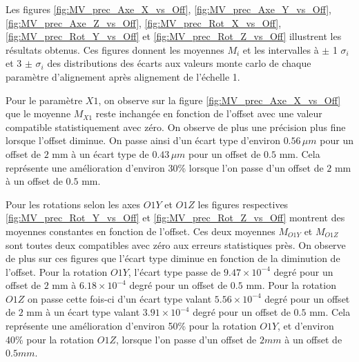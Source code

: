    \medskip

   Les figures \ref{fig:MV_prec_Axe_X_vs_Off}, \ref{fig:MV_prec_Axe_Y_vs_Off}, \ref{fig:MV_prec_Axe_Z_vs_Off}, \ref{fig:MV_prec_Rot_X_vs_Off}, \ref{fig:MV_prec_Rot_Y_vs_Off} et \ref{fig:MV_prec_Rot_Z_vs_Off} illustrent les r\'esultats obtenus. Ces figures donnent les moyennes $M_i$ et les intervalles \`a $\pm$ 1 $\sigma_i$ et 3 $\pm$ $\sigma_i$ des distributions des \'ecarts aux valeurs monte carlo de chaque param\`etre d'alignement apr\`es alignement de l'\'echelle 1.
   
   \medskip

   Pour le param\`etre $X1$, on observe sur la figure \ref{fig:MV_prec_Axe_X_vs_Off} que le moyenne $M_{X1}$ reste inchang\'ee en fonction de l'offset avec une valeur compatible statistiquement avec z\'ero. On observe de plus une pr\'ecision plus fine lorsque l'offset diminue. On passe ainsi d'un \'ecart type d'environ $0.56 \, \mu m$ pour un offset de $2$ mm \`a un \'ecart type de $0.43 \, \mu m$ pour un offset de $0.5$ mm. Cela repr\'esente une am\'elioration d'environ 30\% lorsque l'on passe d'un offset de $2$ mm \`a un offset de $0.5$ mm.
   
   \medskip

   Pour les rotations selon les axes $O1Y$ et $O1Z$ les figures respectives \ref{fig:MV_prec_Rot_Y_vs_Off} et \ref{fig:MV_prec_Rot_Z_vs_Off} montrent des moyennes constantes en fonction de l'offset. Ces deux moyennes $M_{O1Y}$ et $M_{O1Z}$ sont toutes deux compatibles avec z\'ero aux erreurs statistiques pr\`es. On observe de plus sur ces figures que l'\'ecart type diminue en fonction de la diminution de l'offset. Pour la rotation $O1Y$, l'\'ecart type passe de $9.47 \times 10^{-4}$ degr\'e pour un offset de $2$ mm \`a $6.18 \times 10^{-4}$ degr\'e pour un offset de $0.5$ mm. Pour la rotation $O1Z$ on passe cette fois-ci d'un \'ecart type valant $5.56 \times 10^{-4}$ degr\'e pour un offset de $2$ mm \`a un \'ecart type valant $3.91 \times 10^{-4}$ degr\'e pour un offset de $0.5$ mm. Cela repr\'esente une am\'elioration d'environ 50\% pour la rotation $O1Y$, et d'environ 40\% pour la rotation $O1Z$, lorsque l'on passe d'un offset de $2 mm$ \`a un offset de $0.5 mm$.
   
   \medskip
   

